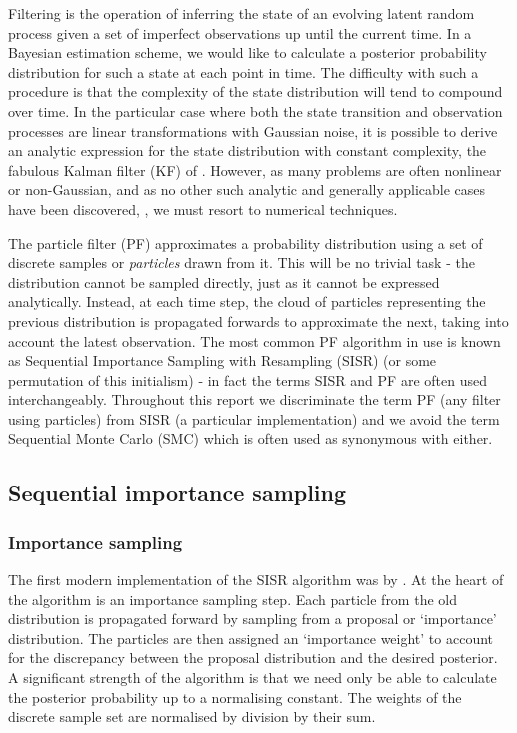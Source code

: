 Filtering is the operation of inferring the state of an evolving latent random process given a set of imperfect observations up until the current time. In a Bayesian estimation scheme, we would like to calculate a posterior probability distribution for such a state at each point in time. The difficulty with such a procedure is that the complexity of the state distribution will tend to compound over time. In the particular case where both the state transition and observation processes are linear transformations with Gaussian noise, it is possible to derive an analytic expression for the state distribution with constant complexity, the fabulous Kalman filter (KF) of \cite{Kalman1960}. However, as many problems are often nonlinear or non-Gaussian, and as no other such analytic and generally applicable cases have been discovered, \cite{Daum2005}, we must resort to numerical techniques.

The particle filter (PF) approximates a probability distribution using a set of discrete samples or \emph{particles} drawn from it. This will be no trivial task - the distribution cannot be sampled directly, just as it cannot be expressed analytically. Instead, at each time step, the cloud of particles representing the previous distribution is propagated forwards to approximate the next, taking into account the latest observation. The most common PF algorithm in use is known as Sequential Importance Sampling with Resampling (SISR) (or some permutation of this initialism) - in fact the terms SISR and PF are often used interchangeably. Throughout this report we discriminate the term PF (any filter using particles) from SISR (a particular implementation) and we avoid the term Sequential Monte Carlo (SMC) which is often used as synonymous with either.

\subsection{Sequential importance sampling}

\subsubsection{Importance sampling}
The first modern implementation of the SISR algorithm was by \cite{Gordon1993}. At the heart of the algorithm is an importance sampling step. Each particle from the old distribution is propagated forward by sampling from a proposal or `importance' distribution. The particles are then assigned an `importance weight' to account for the discrepancy between the proposal distribution and the desired posterior. A significant strength of the algorithm is that we need only be able to calculate the posterior probability up to a normalising constant. The weights of the discrete sample set are normalised by division by their sum.

